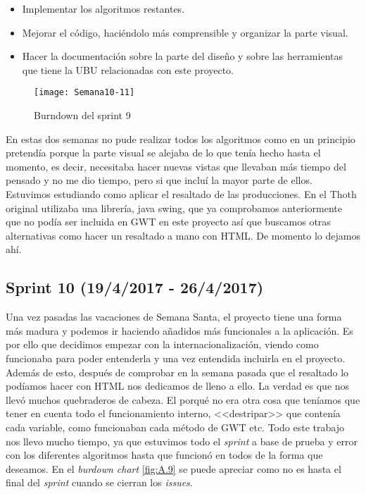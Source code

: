 \begin{itemize}
\item Implementar los algoritmos restantes.
\item Mejorar el código, haciéndolo más comprensible y organizar la parte visual.
\item Hacer la documentación sobre la parte del diseño y sobre las herramientas que tiene la UBU relacionadas con este proyecto.
\end{itemize}

\begin{figure}[h]
\centering
\texttt{[image: Semana10-11]}
\caption{Burndown del sprint 9}
\label{fig:A.8}
\end{figure}

En estas dos semanas no pude realizar todos los algoritmos como en un principio pretendía porque la parte visual se alejaba de lo que tenía hecho hasta el momento, es decir, necesitaba hacer nuevas vistas que llevaban más tiempo del pensado y no me dio tiempo, pero si que incluí la mayor parte de ellos. Estuvimos estudiando como aplicar el resaltado de las producciones. En el Thoth original utilizaba una librería, java swing, que ya comprobamos anteriormente que no podía ser incluida en GWT en este proyecto así que buscamos otras alternativas como hacer un resaltado a mano con HTML. De momento lo dejamos ahí.

\subsection{Sprint 10 (19/4/2017 - 26/4/2017)}

Una vez pasadas las vacaciones de Semana Santa, el proyecto tiene una forma más madura y podemos ir haciendo añadidos más funcionales a la aplicación. Es por ello que decidimos empezar con la internacionalización, viendo como funcionaba para poder entenderla y una vez entendida incluirla en el proyecto. Además de esto, después de comprobar en la semana pasada que el resaltado lo podíamos hacer con HTML nos dedicamos de lleno a ello. La verdad es que nos llevó muchos quebraderos de cabeza. El porqué no era otra cosa que teníamos que tener en cuenta todo el funcionamiento interno, <<destripar>> que contenía cada variable, como funcionaban cada método de GWT etc. Todo este trabajo nos llevo mucho tiempo, ya que estuvimos todo el \emph{sprint} a base de prueba y error con los diferentes algoritmos hasta que funcionó en todos de la forma que deseamos. En el \emph{burdown chart} \ref{fig:A.9} se puede apreciar como no es hasta el final del \emph{sprint} cuando se cierran los \emph{issues}.

